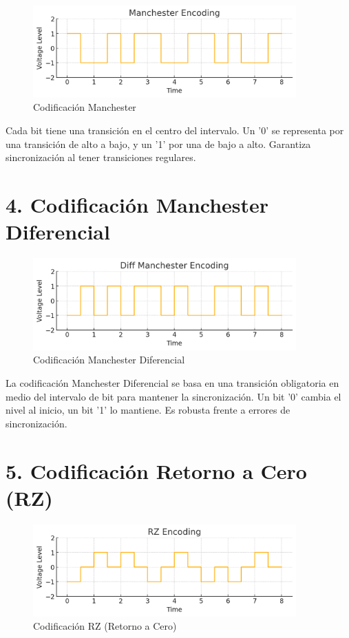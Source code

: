 \documentclass[a4paper,12pt]{article}
\begin{document}
\begin{figure}[h!]
\centering
\includegraphics[width=0.9\textwidth]{manchester_v2.png}
\caption{Codificación Manchester}
\end{figure}

Cada bit tiene una transición en el centro del intervalo. Un '0' se representa por una transición de alto a bajo, y un '1' por una de bajo a alto. Garantiza sincronización al tener transiciones regulares.

\clearpage

\section*{4. Codificación Manchester Diferencial}

\begin{figure}[h!]
\centering
\includegraphics[width=0.9\textwidth]{diff_manchester_v2.png}
\caption{Codificación Manchester Diferencial}
\end{figure}

La codificación Manchester Diferencial se basa en una transición obligatoria en medio del intervalo de bit para mantener la sincronización. Un bit '0' cambia el nivel al inicio, un bit '1' lo mantiene. Es robusta frente a errores de sincronización.

\clearpage

\section*{5. Codificación Retorno a Cero (RZ)}

\begin{figure}[h!]
\centering
\includegraphics[width=0.9\textwidth]{rz_v2.png}
\caption{Codificación RZ (Retorno a Cero)}
\end{figure}
\end{document}
